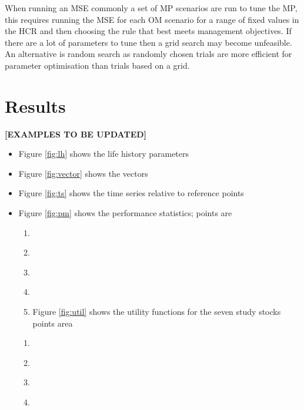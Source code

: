 \documentclass[preprint,12pt]{elsarticle}
\begin{document}
When running an MSE commonly a set of MP scenarios are run to tune the MP, this requires running the MSE for each OM scenario for a range of fixed values in the HCR and then choosing the rule that best meets management objectives. If there are a lot of parameters to tune then a grid search may become unfeasible. An alternative is random search \cite{bergstra2012random} as randomly chosen trials are more efficient for parameter optimisation than trials based on a grid. 

  
\section{Results}

\textbf{[EXAMPLES TO BE UPDATED]}
\begin{itemize}
\item Figure \ref{fig:lh} shows the life history parameters
\item Figure \ref{fig:vector} shows the vectors
\item Figure \ref{fig:ts} shows the time series relative to reference points
\item Figure \ref{fig:pm} shows the performance statistics; points are
\begin{enumerate}
 \item ~
 \item ~
 \item ~
 \item ~\item Figure \ref{fig:util} shows the utility functions for the seven study stocks points area
\end{enumerate}
\begin{enumerate}
 \item ~
 \item ~
 \item ~
 \item ~
\end{enumerate}

\end{itemize}
\end{document}
